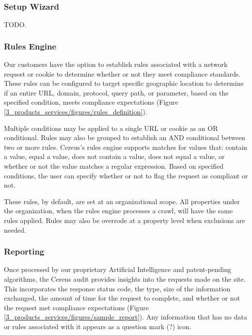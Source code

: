 
\subsubsection{Setup Wizard}

TODO.

\subsubsection{Rules Engine}

Our customers have the option to establish rules associated with a network request or cookie to determine whether or not they meet compliance standards. These rules can be configured to target specific geographic location to determine if an entire URL, domain, protocol, query path, or parameter, based on the specified condition, meets compliance expectations (Figure \ref{3_products_services/figures/rules_definition}).

Multiple conditions may be applied to a single URL or cookie as an OR conditional. Rules may also be grouped to establish an AND conditional between two or more rules. Cereus's rules engine supports matches for values that: contain a value, equal a value, does not contain a value, does not equal a value, or whether or not the value matches a regular expression. Based on specified conditions, the user can specify whether or not to flag the request as compliant or not.


These rules, by default, are set at an organizational scope. All properties under the organization, when the rules engine processes a crawl, will have the same rules applied. Rules may also be overrode at a property level when exclusions are needed.

\subsubsection{Reporting}

Once processed by our proprietary Artificial Intelligence and patent-pending algorithms, the Cereus audit provides insights into the requests made on the site. This incorporates the response status code, the type, size of the information exchanged, the amount of time for the request to complete, and whether or not the request met compliance expectations (Figure \ref{3_products_services/figures/sample_report}). Any information that has no data or rules associated with it appears as a question mark (?) icon.

